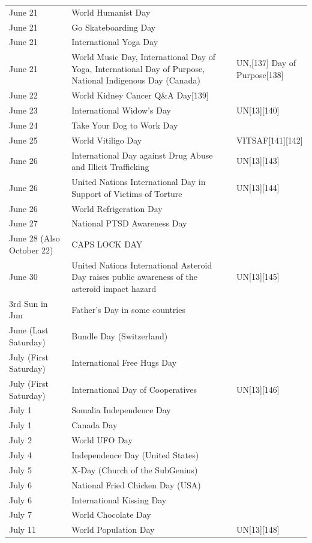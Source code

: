 \documentclass[
  openany]{book}
\begin{document}
\begin{longtable}[t]{>{\raggedright\arraybackslash}p{8em}>{\raggedright\arraybackslash}p{20em}>{\raggedright\arraybackslash}p{12em}}
June 21 & World Humanist Day & \\
June 21 & Go Skateboarding Day & \\
June 21 & International Yoga Day & \\
June 21 & World Music Day, International Day of Yoga, International Day of Purpose, National Indigenous Day (Canada) & UN,[137] Day of Purpose[138]\\
\addlinespace
June 22 & World Kidney Cancer Q\&A Day[139] & \\
June 23 & International Widow's Day & UN[13][140]\\
June 24 & Take Your Dog to Work Day & \\
June 25 & World Vitiligo Day & VITSAF[141][142]\\
June 26 & International Day against Drug Abuse and Illicit Trafficking & UN[13][143]\\
\addlinespace
June 26 & United Nations International Day in Support of Victims of Torture & UN[13][144]\\
June 26 & World Refrigeration Day & \\
June 27 & National PTSD Awareness Day & \\
June 28 (Also October 22) & CAPS LOCK DAY & \\
June 30 & United Nations International Asteroid Day raises public awareness of the asteroid impact hazard & UN[13][145]\\
\addlinespace
3rd Sun in Jun & Father's Day in some countries & \\
June (Last Saturday) & Bundle Day (Switzerland) & \\
July (First Saturday) & International Free Hugs Day & \\
July (First Saturday) & International Day of Cooperatives & UN[13][146]\\
July 1 & Somalia Independence Day & \\
\addlinespace
July 1 & Canada Day & \\
July 2 & World UFO Day & \\
July 4 & Independence Day (United States) & \\
July 5 & X-Day (Church of the SubGenius) & \\
July 6 & National Fried Chicken Day (USA) & \\
\addlinespace
July 6 & International Kissing Day & [147]\\
July 7 & World Chocolate Day & \\
July 11 & World Population Day & UN[13][148]\\

\end{longtable}
\end{document}

